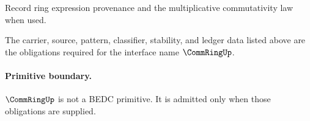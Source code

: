 \begin{definition}
\label{def:commring-ledger-policy}
Record ring expression provenance and the multiplicative commutativity law when used.
\end{definition}

\begin{definition}
\label{def:commring-certificate-obligations}
The carrier, source, pattern, classifier, stability, and ledger data listed above are the obligations required for the interface name \(\CommRingUp\).
\end{definition}

\paragraph{Primitive boundary.}
\(\CommRingUp\) is not a BEDC primitive. It is admitted only when those obligations are supplied.

